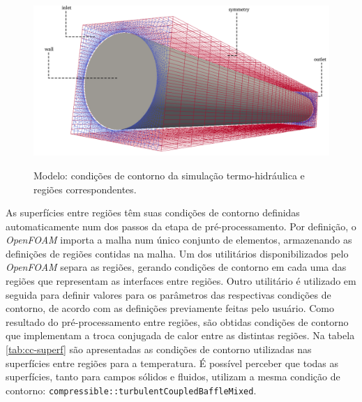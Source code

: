 \begin{figure}[htb]
  \caption{Modelo: condições de contorno da simulação termo-hidráulica e regiões
    correspondentes.}
  \centering\includegraphics[scale=0.5]{figuras/inlet_paredes_extremos_wireframe2.png}
  \label{fig:ccth}
\end{figure}

As superfícies entre regiões têm suas condições de contorno definidas automaticamente
num dos passos da etapa de pré-processamento. Por definição, o \textit{OpenFOAM} importa
a malha num único conjunto de elementos, armazenando as definições de regiões
contidas na malha. Um dos utilitários disponibilizados pelo \textit{OpenFOAM} separa
as regiões, gerando condições de contorno em cada uma das regiões que representam
as interfaces entre regiões. Outro utilitário é utilizado em seguida para definir valores
para os parâmetros das respectivas condições de contorno, de acordo com as definições
previamente feitas pelo usuário. Como resultado do pré-processamento
entre regiões, são obtidas condições de contorno que implementam a troca
conjugada de calor entre as distintas regiões. Na tabela \ref{tab:cc-superf} são
apresentadas as condições de contorno utilizadas nas superfícies entre regiões para a temperatura.
É possível perceber que todas as superfícies,
tanto para campos sólidos e fluidos, utilizam a mesma condição de contorno:
\texttt{compressible::turbulentCoupledBaffleMixed}.

